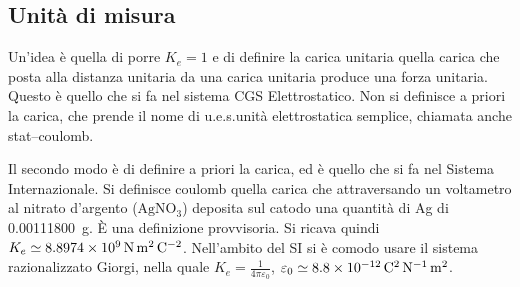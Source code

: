 \subsection{Unità di misura}
Un'idea è quella di porre $K_e=1$ e di definire la carica unitaria quella carica che posta alla distanza unitaria da una carica unitaria produce una forza unitaria. Questo è quello che si fa nel sistema CGS Elettrostatico. Non si definisce a priori la carica, che prende il nome di u.e.s.\@ unità elettrostatica semplice, chiamata anche stat--coulomb.

Il secondo modo è di definire a priori la carica, ed è quello che si fa nel Sistema Internazionale. Si definisce coulomb quella carica che attraversando un voltametro al nitrato d'argento ($\mathrm{AgNO_3}$) deposita sul catodo una quantità di Ag di \SI{0.00111800}{\gram}. \`E una definizione provvisoria. Si ricava quindi $K_e\simeq \SI{8.8974E9}{\newton\meter\squared\per\coulomb\squared}$. Nell'ambito del SI si è comodo usare il sistema razionalizzato Giorgi, nella quale $K_e=\frac{1}{4\pi\varepsilon_0}$, $\varepsilon_0\simeq \SI{8.8E-12}{\coulomb\squared\per\newton\metre\squared}$.

